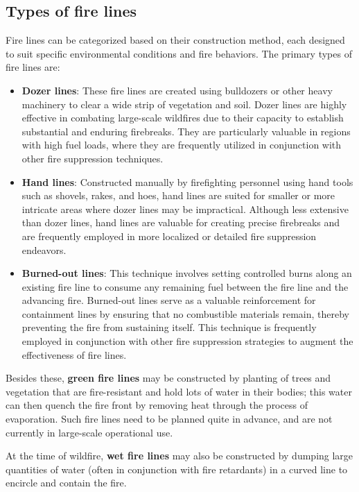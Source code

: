 \documentclass[
  12 pt,
]{Nemilov}
\begin{document}
\subsection{Types of fire lines}\label{types-of-fire-lines}

Fire lines can be categorized based on their construction method, each designed to suit specific environmental conditions and fire behaviors. The primary types of fire lines are:

\begin{itemize}
\item
  \textbf{Dozer lines}: These fire lines are created using bulldozers or other heavy machinery to clear a wide strip of vegetation and soil. Dozer lines are highly effective in combating large-scale wildfires due to their capacity to establish substantial and enduring firebreaks. They are particularly valuable in regions with high fuel loads, where they are frequently utilized in conjunction with other fire suppression techniques.
\item
  \textbf{Hand lines}: Constructed manually by firefighting personnel using hand tools such as shovels, rakes, and hoes, hand lines are suited for smaller or more intricate areas where dozer lines may be impractical. Although less extensive than dozer lines, hand lines are valuable for creating precise firebreaks and are frequently employed in more localized or detailed fire suppression endeavors.
\item
  \textbf{Burned-out lines}: This technique involves setting controlled burns along an existing fire line to consume any remaining fuel between the fire line and the advancing fire. Burned-out lines serve as a valuable reinforcement for containment lines by ensuring that no combustible materials remain, thereby preventing the fire from sustaining itself. This technique is frequently employed in conjunction with other fire suppression strategies to augment the effectiveness of fire lines.
\end{itemize}

Besides these, \textbf{green fire lines} may be constructed by planting of trees and vegetation that are fire-resistant and hold lots of water in their bodies; this water can then quench the fire front by removing heat through the process of evaporation. Such fire lines need to be planned quite in advance, and are not currently in large-scale operational use.

At the time of wildfire, \textbf{wet fire lines} may also be constructed by dumping large quantities of water (often in conjunction with fire retardants) in a curved line to encircle and contain the fire.
\end{document}
